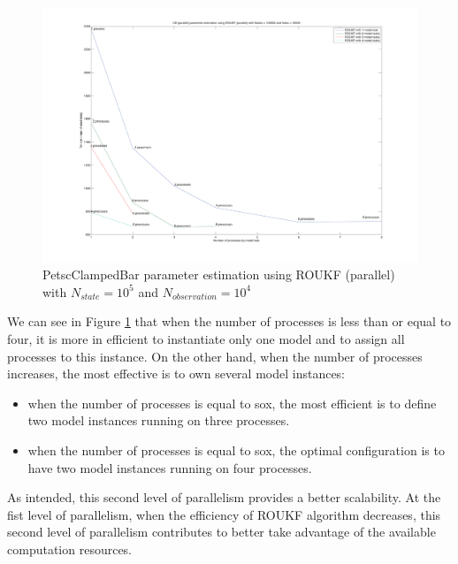 \begin{figure}
  \caption{PetscClampedBar parameter estimation using ROUKF (parallel) with $N_{state} = 10^5$ and $N_{observation} = 10^4$ }

  \vspace{1cm}

  \label{fig:roukf_par_time}
  \centering\includegraphics[width=1.\textwidth]{figure/roukf_par_3_test.pdf}
\end{figure}


We can see in Figure \ref{fig:roukf_par_time} that when the number of processes is less than or equal to four, it is more in efficient to instantiate only one model and to assign all processes to this instance. On the other hand, when the number of processes increases, the most effective is to own
several model instances:

\begin{itemize}

\item when the number of processes is equal to sox, the most efficient is to define two model instances running on three processes.

\item when the number of processes is equal to sox, the optimal configuration is to have two model instances running on four processes.

\end{itemize}


As intended, this second level of parallelism provides a better scalability. At the fist level of parallelism, when the efficiency of ROUKF algorithm decreases, this second level of parallelism contributes to better take advantage of the  available computation resources.
